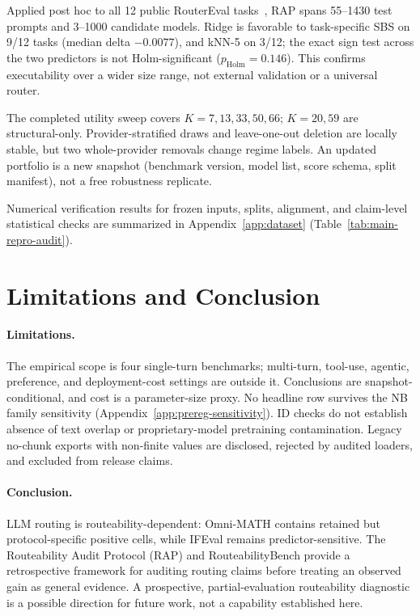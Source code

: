 \documentclass{article}
\begin{document}
Applied post hoc to all 12 public RouterEval tasks~\citep{huang2025routereval}, RAP spans 55--1430 test prompts and 3--1000 candidate models. Ridge is favorable to task-specific SBS on 9/12 tasks (median delta $-0.0077$), and kNN-5 on 3/12; the exact sign test across the two predictors is not Holm-significant ($p_{\mathrm{Holm}}=0.146$). This confirms executability over a wider size range, not external validation or a universal router.

The completed utility sweep covers $K=7,13,33,50,66$; $K=20,59$ are structural-only. Provider-stratified draws and leave-one-out deletion are locally stable, but two whole-provider removals change regime labels. An updated portfolio is a new snapshot (benchmark version, model list, score schema, split manifest), not a free robustness replicate.

Numerical verification results for frozen inputs, splits, alignment, and claim-level statistical checks are summarized in Appendix~\ref{app:dataset} (Table~\ref{tab:main-repro-audit}).

\section{Limitations and Conclusion}
\label{sec:limitations}

\paragraph{Limitations.}
The empirical scope is four single-turn benchmarks; multi-turn, tool-use, agentic, preference, and deployment-cost settings are outside it. Conclusions are snapshot-conditional, and cost is a parameter-size proxy. No headline row survives the NB family sensitivity (Appendix~\ref{app:prereg-sensitivity}). ID checks do not establish absence of text overlap or proprietary-model pretraining contamination. Legacy no-chunk exports with non-finite values are disclosed, rejected by audited loaders, and excluded from release claims.

\paragraph{Conclusion.}
LLM routing is routeability-dependent: Omni-MATH contains retained but protocol-specific positive cells, while IFEval remains predictor-sensitive. The Routeability Audit Protocol (RAP) and RouteabilityBench provide a retrospective framework for auditing routing claims before treating an observed gain as general evidence. A prospective, partial-evaluation routeability diagnostic is a possible direction for future work, not a capability established here.
\end{document}
